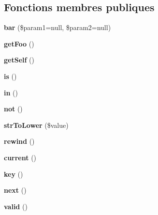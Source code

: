 \subsection*{Fonctions membres publiques}
\begin{DoxyCompactItemize}
\item 
{\bfseries bar} (\$param1=null, \$param2=null)\hypertarget{class_twig_test_foo_a2d508d75d96eadad4b0b99306b10ca12}{}\label{class_twig_test_foo_a2d508d75d96eadad4b0b99306b10ca12}

\item 
{\bfseries get\+Foo} ()\hypertarget{class_twig_test_foo_a4d92c456d98bc078936e71714ca1840f}{}\label{class_twig_test_foo_a4d92c456d98bc078936e71714ca1840f}

\item 
{\bfseries get\+Self} ()\hypertarget{class_twig_test_foo_ab5aad5fd49197b75ad66d28c0150c528}{}\label{class_twig_test_foo_ab5aad5fd49197b75ad66d28c0150c528}

\item 
{\bfseries is} ()\hypertarget{class_twig_test_foo_a0349d1bb80dac816bf0f23e2430d3561}{}\label{class_twig_test_foo_a0349d1bb80dac816bf0f23e2430d3561}

\item 
{\bfseries in} ()\hypertarget{class_twig_test_foo_a7cda30aef6b6831622ae52cbc81b0ca6}{}\label{class_twig_test_foo_a7cda30aef6b6831622ae52cbc81b0ca6}

\item 
{\bfseries not} ()\hypertarget{class_twig_test_foo_ae4b749acc120be8c42b44ac42a2fc102}{}\label{class_twig_test_foo_ae4b749acc120be8c42b44ac42a2fc102}

\item 
{\bfseries str\+To\+Lower} (\$value)\hypertarget{class_twig_test_foo_ada8ba0f7fcddae60b148fcf9c69fc9d6}{}\label{class_twig_test_foo_ada8ba0f7fcddae60b148fcf9c69fc9d6}

\item 
{\bfseries rewind} ()\hypertarget{class_twig_test_foo_ae619dcf2218c21549cb65d875bbc6c9c}{}\label{class_twig_test_foo_ae619dcf2218c21549cb65d875bbc6c9c}

\item 
{\bfseries current} ()\hypertarget{class_twig_test_foo_af343507d1926e6ecf964625d41db528c}{}\label{class_twig_test_foo_af343507d1926e6ecf964625d41db528c}

\item 
{\bfseries key} ()\hypertarget{class_twig_test_foo_a729e946b4ef600e71740113c6d4332c0}{}\label{class_twig_test_foo_a729e946b4ef600e71740113c6d4332c0}

\item 
{\bfseries next} ()\hypertarget{class_twig_test_foo_acea62048bfee7b3cd80ed446c86fb78a}{}\label{class_twig_test_foo_acea62048bfee7b3cd80ed446c86fb78a}

\item 
{\bfseries valid} ()\hypertarget{class_twig_test_foo_abb9f0d6adf1eb9b3b55712056861a247}{}\label{class_twig_test_foo_abb9f0d6adf1eb9b3b55712056861a247}

\end{DoxyCompactItemize}
